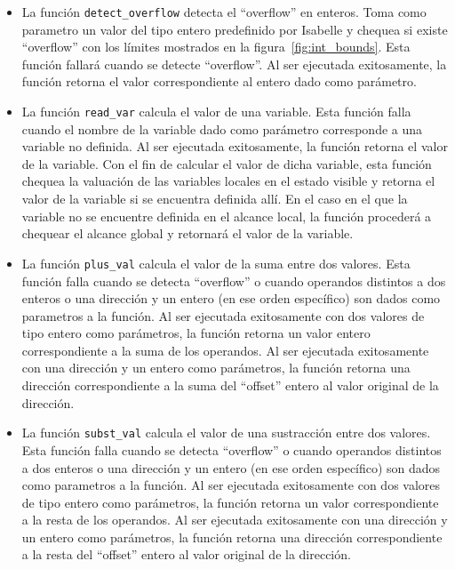 \begin{itemize}
\item{La función \verb|detect_overflow| detecta el ``overflow'' en enteros.
Toma como parametro un valor del tipo entero predefinido por Isabelle y chequea si existe ``overflow'' con los límites mostrados en la figura~\ref{fig:int_bounds}.
Esta función fallará cuando se detecte ``overflow''.
Al ser ejecutada exitosamente, la función retorna el valor correspondiente al entero dado como parámetro.}

\item{La función \verb|read_var| calcula el valor de una variable.
Esta función falla cuando el nombre de la variable dado como parámetro corresponde a una variable no definida.
Al ser ejecutada exitosamente, la función retorna el valor de la variable.
Con el fin de calcular el valor de dicha variable, esta función chequea la valuación de las variables locales en el estado visible y retorna el valor de la variable si se encuentra definida allí.
En el caso en el que la variable no se encuentre definida en el alcance local, la función procederá a chequear el alcance global y retornará el valor de la variable.}

\item{La función \verb|plus_val| calcula el valor de la suma entre dos valores.
Esta función falla cuando se detecta ``overflow'' o cuando operandos distintos a dos enteros o una dirección y un entero (en ese orden específico) son dados como parametros a la función.
Al ser ejecutada exitosamente con dos valores de tipo entero como parámetros, la función retorna un valor entero correspondiente a la suma de los operandos.
Al ser ejecutada exitosamente con una dirección y un entero como parámetros, la función retorna una dirección correspondiente a la suma del ``offset'' entero al valor original de la dirección.}

\item{La función \verb|subst_val| calcula el valor de una sustracción entre dos valores.
Esta función falla cuando se detecta ``overflow'' o cuando operandos distintos a dos enteros o una dirección y un entero (en ese orden específico) son dados como parametros a la función.
Al ser ejecutada exitosamente con dos valores de tipo entero como parámetros, la función retorna un valor correspondiente a la resta de los operandos.
Al ser ejecutada exitosamente con una dirección y un entero como parámetros, la función retorna una dirección correspondiente a la resta del ``offset'' entero al valor original de la dirección.}


\end{itemize}
